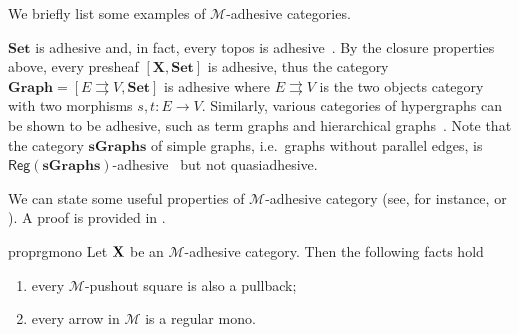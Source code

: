 \documentclass[3p]{elsarticle}
\newcommand{\cat}[1]{\ensuremath{\mathbf{#1}}}
\def\C{\textbf {\textup{C}}}
\def\X{\textbf {\textup{X}}}
\newcommand{\reg}{\mathsf{Reg}}
\theoremstyle{remark}
\theoremstyle{definition}
\begin{document}
We briefly list some examples of $\mathcal{M}$-adhesive categories.

\begin{exa}
	\label{ex:adhesive}
	$\cat{Set}$ is adhesive and, in fact, every topos is
	adhesive~\cite{lack2006toposes}. By the closure properties above, every presheaf $[\cat{X},\cat{Set}]$ is adhesive, thus the category
	$\cat{Graph} = [ E \rightrightarrows V, \cat{Set}]$ is adhesive
	where $E \rightrightarrows {V}$ is the two objects category with two
	morphisms $s,t \colon{E} \to {V}$. Similarly, various
	categories of hypergraphs can be shown to be adhesive, such as term
	graphs and hierarchical graphs~\cite{CastelnovoGM24}. Note that the category $\cat{sGraphs}$ of simple graphs, 
	i.e.~graphs without parallel edges, is
	$\reg{(\cat{sGraphs})}$-adhesive~\cite{BehrHK23} but not
	quasiadhesive.
\end{exa}

We can state some useful properties of $\mathcal{M}$-adhesive category
(see, for instance, \cite[Thm.~4.26]{ehrig2006fundamentals} or \cite[Fact 2.6]{azzi2019essence}). A proof is provided in .
\begin{restatable}{prop}{rgmono}\label{prop:regmono}
	Let $\X$ be an $\mathcal{M}$-adhesive category. Then the following facts hold
	\begin{enumerate}
		\item every $\mathcal{M}$-pushout square is also a pullback;
		\item every arrow in $\mathcal{M}$ is a regular mono.
	\end{enumerate}
\end{restatable}
\end{document}
